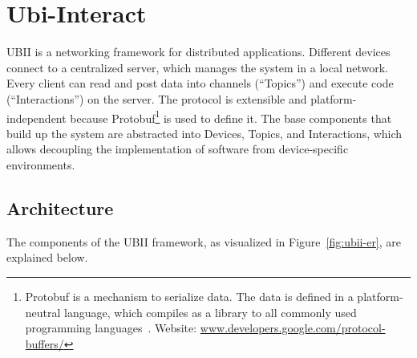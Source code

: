 \section{Ubi-Interact}\label{section:ubi-interact}

\acf{UBII} is a networking framework for distributed applications. Different devices connect to a centralized server, which manages the system in a local network. Every client can read and post data into channels (\enquote{Topics}) and execute code (\enquote{Interactions}) on the server. The protocol is extensible and platform-independent because \acf{Protobuf}\footnote{Protobuf is a mechanism to serialize data. The data is defined in a platform-neutral language, which compiles as a library to all commonly used programming languages~\cite{GoogleLLC.2019b}. Website: \href{https://developers.google.com/protocol-buffers/}{www.developers.google.com/protocol-buffers/}} is used to define it. The base components that build up the system are abstracted into Devices, Topics, and Interactions, which allows decoupling the implementation of software from device-specific environments.


\subsection{Architecture}\label{subsection:architecture}

The components of the \ac{UBII} framework, as visualized in Figure~\ref{fig:ubii-er}, are explained below.

